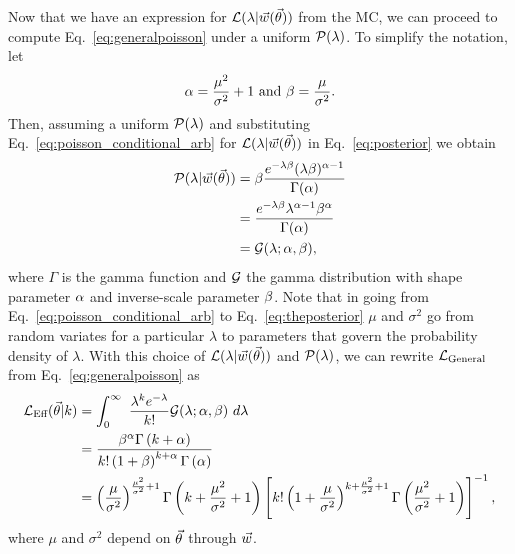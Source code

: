 Now that we have an expression for $\mathcal{L}(\lambda|\vec{w}(\vec{\theta}))$ from the MC, we can proceed to compute Eq.~\eqref{eq:generalpoisson} under a uniform $\mathcal{P}(\lambda)$.
To simplify the notation, let
\begin{equation}\label{eq:alphabetamc}
\alpha = \frac{\mu^2}{\sigma^2}+1~\textmd{and}~\beta=\frac{\mu}{\sigma^2}.
\end{equation}
Then, assuming a uniform $\mathcal{P}(\lambda)$ and substituting Eq.~\eqref{eq:poisson_conditional_arb} for $\mathcal{L}(\lambda|\vec{w}(\vec{\theta}))$ in Eq.~\eqref{eq:posterior} we obtain
\begin{align} \label{eq:theposterior}
\mathcal{P}(\lambda|\vec{w}(\vec{\theta})) &= \beta \frac{ e^{-\lambda \beta}(\lambda \beta )^{\alpha-1}}{\Gamma(\alpha)}\nonumber \\
&= \frac{e^{-\lambda \beta } \lambda^{\alpha-1} \beta^{\alpha}}{\Gamma(\alpha)} \nonumber \\
&= \mathcal{G}(\lambda;\alpha, \beta),
\end{align}
where $\Gamma$ is the gamma function and $\mathcal{G}$ the gamma distribution with shape parameter $\alpha$ and inverse-scale parameter $\beta$.
Note that in going from Eq.~\eqref{eq:poisson_conditional_arb} to Eq.~\eqref{eq:theposterior} $\mu$ and $\sigma^2$ go from random variates for a particular $\lambda$ to parameters that govern the probability density of $\lambda$.
With this choice of $\mathcal{L}(\lambda|\vec{w}(\vec{\theta}))$ and $\mathcal{P}(\lambda)$, we can rewrite $\mathcal{L}_{\rm General}$ from Eq.~\eqref{eq:generalpoisson} as
\begin{align}
\mathcal{L}_\textmd{Eff}(\vec{\theta}|k) &=\int_{0}^{\infty}~\frac{\lambda^k e^{-\lambda}}{k!}\mathcal{G}(\lambda;\alpha, \beta)~d\lambda \\
&= \frac{\beta^\alpha\Gamma\left(k+\alpha\right)}{k!\left(1+\beta\right)^{k+\alpha}\Gamma\left(\alpha\right)} \\
&= \left(\frac{\mu}{\sigma^2}\right)^{\frac{\mu^2}{\sigma^2}+1}\Gamma\left(k+\frac{\mu^2}{\sigma^2}+1\right)\left[k!\left(1+\frac{\mu}{\sigma^2}\right)^{k+\frac{\mu^2}{\sigma^2}+1}\Gamma\left(\frac{\mu^2}{\sigma^2}+1\right)\right]^{-1}, \label{eq:parametrizedpoisson}
\end{align}
where $\mu$ and $\sigma^2$ depend on $\vec{\theta}$ through $\vec{w}$.

